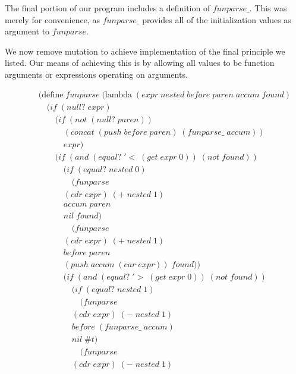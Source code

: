 The final portion of our program includes a definition of $funparse\_$. This was merely 
for convenience, as $funparse\_$ provides all of the initialization values as argument 
to $funparse$.

We now remove mutation to achieve implementation of the final principle we listed. Our 
means of achieving this is by allowing all values to be function arguments or expressions 
operating on arguments.

\begin{figure}[ht]
\caption{}\label{scheme}
\begin{align*}
& (\text{define} \; funparse \; (\text{lambda} \; (expr \; nested \; before \; paren \; accum \; found) \; 
\\& \quad (if \; (null? \; expr)
\\& \qquad (if \; (not \; (null? \; paren))
\\& \qquad \quad (concat \; (push \; before \; paren) \; (funparse\_ \; accum))
\\& \qquad \quad expr)
\\& \qquad (if \; (and \; (equal? \; '< \; (get \; expr \; 0)) \; (not \; found))
\\& \qquad \quad (if \; (equal? \; nested \; 0)
\\& \qquad \qquad (funparse \; 
\\& \qquad \quad (cdr \; expr) \; (+ \; nested \; 1) \; 
\\& \qquad \quad accum \; paren \; 
\\& \qquad \quad nil \; found)
\\& \qquad \qquad (funparse \; 
\\& \qquad \quad (cdr \; expr) \; (+ \; nested \; 1) \; 
\\& \qquad \quad before \; paren \; 
\\& \qquad \quad (push \; accum \; (car \; expr)) \; found))
\\& \qquad \quad (if \; (and \; (equal? \; '> \; (get \; expr \; 0)) \; (not \; found))
\\& \qquad \qquad (if \; (equal? \; nested \; 1)
\\& \qquad \qquad \quad (funparse \; 
\\& \qquad \qquad (cdr \; expr) \; (- \; nested \; 1) \; 
\\& \qquad \qquad before \; (funparse\_ \; accum) \; 
\\& \qquad \qquad nil \; \#t)
\\& \qquad \qquad \quad (funparse \; 
\\& \qquad \qquad (cdr \; expr) \; (- \; nested \; 1) \; 

\end{align*}
\end{figure}
